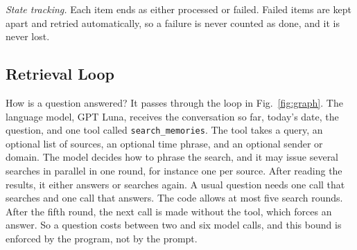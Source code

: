 \documentclass[conference]{IEEEtran}
\newcommand{\llmname}{GPT\nobreakdash-5.6 Luna}
\begin{document}
\textit{State tracking.} Each item ends as either processed or failed. Failed items are kept apart and retried automatically, so a failure is never counted as done, and it is never lost.

\subsection{Retrieval Loop}
How is a question answered? It passes through the loop in Fig.~\ref{fig:graph}. The language model, \llmname{}, receives the conversation so far, today's date, the question, and one tool called \texttt{search\_memories}. The tool takes a query, an optional list of sources, an optional time phrase, and an optional sender or domain. The model decides how to phrase the search, and it may issue several searches in parallel in one round, for instance one per source. After reading the results, it either answers or searches again. A usual question needs one call that searches and one call that answers. The code allows at most five search rounds. After the fifth round, the next call is made without the tool, which forces an answer. So a question costs between two and six model calls, and this bound is enforced by the program, not by the prompt.
\end{document}
